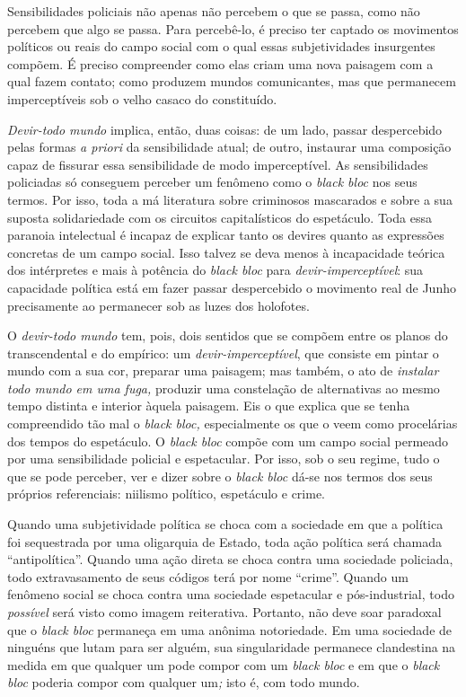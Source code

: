 Sensibilidades policiais não apenas não percebem o que se passa, como
não percebem que algo se passa. Para percebê-lo, é preciso ter captado
os movimentos políticos ou reais do campo social com o qual essas
subjetividades insurgentes compõem. É preciso compreender como elas
criam uma nova paisagem com a qual fazem contato; como produzem mundos
comunicantes, mas que permanecem imperceptíveis sob o velho casaco do
constituído.

\emph{Devir-todo mundo }implica, então, duas coisas: de um lado, passar
despercebido pelas formas \emph{a priori }da sensibilidade atual; de
outro, instaurar uma composição capaz de fissurar essa sensibilidade de
modo imperceptível. As sensibilidades policiadas só conseguem perceber
um fenômeno como o \emph{black bloc} nos seus termos. Por isso, toda a
má literatura sobre criminosos mascarados e sobre a sua suposta
solidariedade com os circuitos capitalísticos do espetáculo. Toda essa
paranoia intelectual é incapaz de explicar tanto os devires quanto as
expressões concretas de um campo social. Isso talvez se deva menos à
incapacidade teórica dos intérpretes e mais à potência do \emph{black
bloc }para \emph{devir-imperceptível}: sua capacidade política está em
fazer passar despercebido o movimento real de Junho precisamente ao
permanecer sob as luzes dos holofotes.

O \emph{devir-todo mundo} tem, pois, dois sentidos que se compõem entre
os planos do transcendental e do empírico: um
\emph{devir-imperceptível}, que consiste em pintar o mundo com a sua
cor, preparar uma paisagem; mas também, o ato de \emph{instalar todo
mundo em uma fuga, }produzir uma constelação de alternativas ao mesmo
tempo distinta e interior àquela paisagem. Eis o que explica que se
tenha compreendido tão mal o \emph{black bloc, }especialmente os que o
veem como procelárias dos tempos do espetáculo. O \emph{black bloc}
compõe com um campo social permeado por uma sensibilidade policial e
espetacular. Por isso, sob o seu regime, tudo o que se pode perceber,
ver e dizer sobre o \emph{black bloc} dá-se nos termos dos seus próprios
referenciais: niilismo político, espetáculo e crime.

Quando uma subjetividade política se choca com a sociedade em que a
política foi sequestrada por uma oligarquia de Estado, toda ação
política será chamada ``antipolítica''. Quando uma ação direta se choca
contra uma sociedade policiada, todo extravasamento de seus códigos terá
por nome ``crime''. Quando um fenômeno social se choca contra uma
sociedade espetacular e pós-industrial, todo\emph{ possível }será visto
como imagem reiterativa. Portanto, não deve soar paradoxal que o
\emph{black bloc }permaneça em uma anônima notoriedade. Em uma sociedade
de ninguéns que lutam para ser alguém, sua singularidade permanece
clandestina na medida em que qualquer um pode compor com um \emph{black
bloc }e em que o \emph{black bloc }poderia compor com qualquer um\emph{;
}isto é, com todo mundo.

